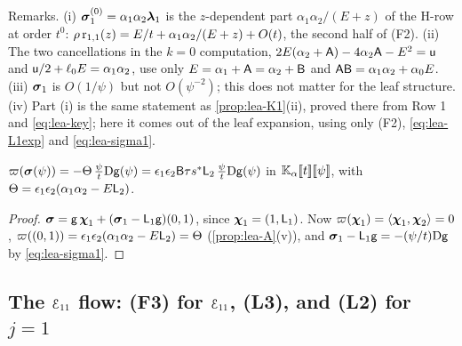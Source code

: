 Remarks. (i) $\boldsymbol{\sigma}^{(0)}_1 = \alpha_1\alpha_2\boldsymbol{\lambda}_1$ is the $z$-dependent part $\alpha_1\alpha_2/(E+z)$ of the H-row at order $t^0$: $\rho\,\mathrm{r}_{1,1}(z) = E/t + \alpha_1\alpha_2/(E+z) + O(t)$, the second half of (F2). (ii) The two cancellations in the $k = 0$ computation, $2E(\alpha_2+\mathsf{A}) - 4\alpha_2\mathsf{A} - E^2 = \mathsf{u}$ and $\mathsf{u}/2 + \ell_0E = \alpha_1\alpha_2$, use only $E = \alpha_1+\mathsf{A} = \alpha_2+\mathsf{B}$ and $\mathsf{A}\mathsf{B} = \alpha_1\alpha_2 + \alpha_0E$. (iii) $\boldsymbol{\sigma}_1$ is $O(1/\psi)$ but not $O(\psi^{-2})$; this does not matter for the leaf structure. (iv) Part (i) is the same statement as \cref{prop:lea-K1}(ii), proved there from Row 1 and \eqref{eq:lea-key}; here it comes out of the leaf expansion, using only (F2), \eqref{eq:lea-L1exp} and \eqref{eq:lea-sigma1}.

\begin{prop}
\label{prop:lea-proj}
$\varpi(\boldsymbol{\sigma}(\psi)) = -\Theta\,\frac{\psi}{t}\mathrm{D}\mathsf{g}(\psi) = \epsilon_1\epsilon_2\mathsf{B}\tau s^{\ast}\mathsf{L}_2\,\frac{\psi}{t}\mathrm{D}\mathsf{g}(\psi)$ in $\mathbb{K}_{\alpha}[\![ t ]\!][\![ \psi ]\!]$, with $\Theta = \epsilon_1\epsilon_2(\alpha_1\alpha_2 - E\mathsf{L}_2)$.
\end{prop}

\begin{proof}
$\boldsymbol{\sigma} = \mathsf{g}\,\boldsymbol{\chi}_1 + (\boldsymbol{\sigma}_1 - \mathsf{L}_1\mathsf{g})(0,1)$, since $\boldsymbol{\chi}_1 = (1,\mathsf{L}_1)$. Now $\varpi(\boldsymbol{\chi}_1) = \langle\boldsymbol{\chi}_1,\boldsymbol{\chi}_2\rangle = 0$, $\varpi((0,1)) = \epsilon_1\epsilon_2(\alpha_1\alpha_2 - E\mathsf{L}_2) = \Theta$ (\cref{prop:lea-A}(v)), and $\boldsymbol{\sigma}_1 - \mathsf{L}_1\mathsf{g} = -(\psi/t)\mathrm{D}\mathsf{g}$ by \eqref{eq:lea-sigma1}.
\end{proof}

\subsection{The \texorpdfstring{$\mathcal{E}_{11}$}{E11} flow: (F3) for \texorpdfstring{$\mathcal{E}_{11}$}{E11}, (L3), and (L2) for \texorpdfstring{$j = 1$}{j = 1}}
\label{sec:lea-flow}

